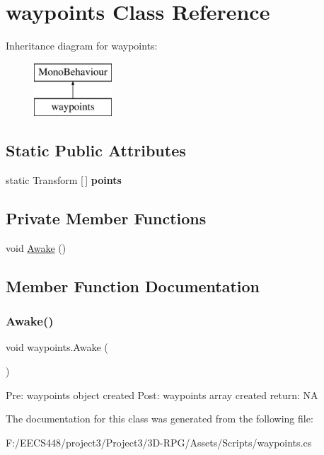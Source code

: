 \hypertarget{classwaypoints}{}\section{waypoints Class Reference}
\label{classwaypoints}
Inheritance diagram for waypoints\+:\begin{figure}[H]
\begin{center}
\leavevmode
\includegraphics[height=2.000000cm]{classwaypoints}
\end{center}
\end{figure}
\subsection*{Static Public Attributes}
\begin{DoxyCompactItemize}
\item 
\mbox{\label{classwaypoints_aeb6c02b5eda032e8ac18c0bc79214cff}} 
static Transform \mbox{[}$\,$\mbox{]} {\bfseries points}
\end{DoxyCompactItemize}
\subsection*{Private Member Functions}
\begin{DoxyCompactItemize}
\item 
void \hyperlink{classwaypoints_ab4aab525c65e64319c6857609e1405d7}{Awake} ()
\end{DoxyCompactItemize}


\subsection{Member Function Documentation}
\mbox{\label{classwaypoints_ab4aab525c65e64319c6857609e1405d7}} 
\subsubsection{\texorpdfstring{Awake()}{Awake()}}
{\footnotesize\ttfamily void waypoints.\+Awake (\begin{DoxyParamCaption}{ }\end{DoxyParamCaption})\hspace{0.3cm}{\ttfamily [private]}}

Pre\+: waypoints object created Post\+: waypoints array created return\+: NA 

The documentation for this class was generated from the following file\+:\begin{DoxyCompactItemize}
\item 
F\+:/\+E\+E\+C\+S448/project3/\+Project3/3\+D-\/\+R\+P\+G/\+Assets/\+Scripts/waypoints.\+cs\end{DoxyCompactItemize}
